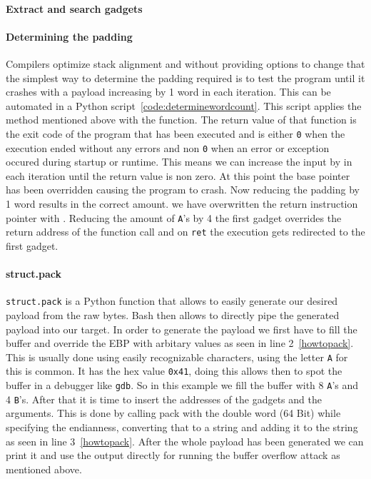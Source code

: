 \documentclass[journal=tosc,submission, notanonymous]{iacrtrans}
\begin{document}
\paragraph{Extract and search gadgets}
\paragraph{Determining the padding}
Compilers optimize stack alignment and without providing options to change that the simplest way to determine the padding required is to test the program until it crashes with a payload increasing by 1 word in each iteration. This can be automated in a Python script~\cref{code:determinewordcount}. This script applies the method mentioned above with the  function. The return value of that function is the exit code of the program that has been executed and is either \Verb+0+ when the execution ended without any errors and non \Verb+0+ when an error or exception occured during startup or runtime. This means we can increase the input by  in each iteration until the return value is non zero. At this point the base pointer  has been overridden causing the program to crash. Now reducing the padding by 1 word results in the correct amount.
we have overwritten the return instruction pointer with . Reducing the amount of \Verb+A+'s by 4 the first gadget overrides the return address of the function call and on \Verb+ret+ the execution gets redirected to the first gadget.
\paragraph{struct.pack}
\Verb+struct.pack+ is a Python function that allows to easily generate our desired payload from the raw bytes. Bash then allows to directly pipe the generated payload into our target. In order to generate the payload we first have to fill the buffer and override the EBP with arbitary values as seen in line 2~\cref{howtopack}. This is usually done using easily recognizable characters, using the letter \Verb+A+ for this is common. It has the hex value \Verb+0x41+, doing this allows then to spot the buffer in a debugger like \Verb+gdb+. So in this example we fill the buffer with 8 \Verb+A+'s and 4 \Verb+B+'s. After that it is time to insert the addresses of the gadgets and the arguments. This is done by calling pack with the double word (64 Bit) while specifying the endianness, converting that to a string and adding it to the string as seen in line 3~\cref{howtopack}. After the whole payload has been generated we can print it and use the output directly for running the buffer overflow attack as mentioned above.
\end{document}
